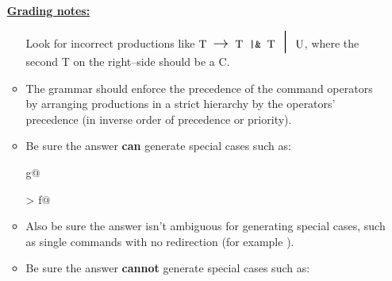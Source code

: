 \documentclass[11pt,fleqn]{article}
\begin{document}
\begin{enumerate}
\begin{info}{\textbf{\underline{Grading notes:}}}
\begin{itemize}
                    Look for incorrect productions like
                    \(
                      \mathrm{
                      \production{T}{T \ \: \texttt{|\&} \ \: T \midspc U}
                      }
                    \), where the second T on the right--side should be a C.

              \item The grammar should enforce the precedence of the command
                    operators by arranging productions in a strict hierarchy
                    by the operators' precedence (in inverse order of
                    precedence or priority).

                    \enlargethispage{5mm}

              \item Be sure the answer \textbf{can} generate special cases
                    such as:

                    \vspace{-3mm}

                    \begin{multicols}{4}

                      \centering

                       g@

                      \columnbreak

                      \verb@a > f@

                      \columnbreak

                      \verb@a@

                    \end{multicols}

                    \vspace{-3mm}

              \item Also be sure the answer isn't ambiguous for generating
                    special cases, such as single commands with no redirection
                    (for example \verb@a@).

              \item Be sure the answer \textbf{cannot} generate special cases
                    such as:

                    \vspace{-3mm}

                    \begin{multicols}{4}

                      \centering


\end{multicols}
\end{itemize}
\end{info}
\end{enumerate}
\end{document}
